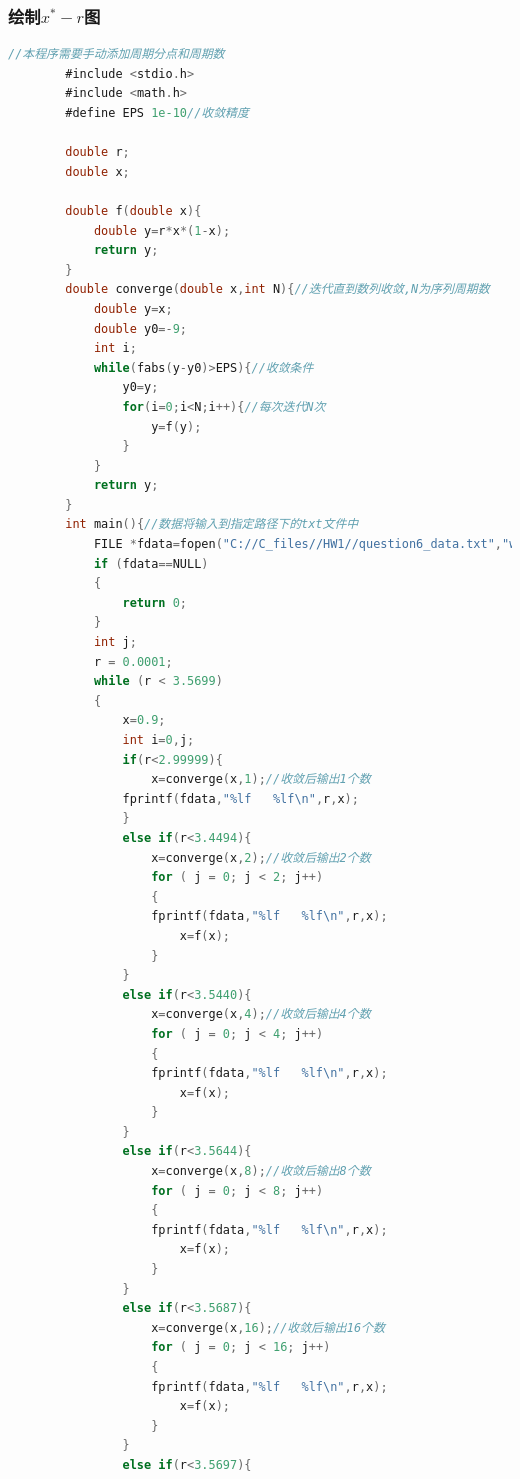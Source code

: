 \documentclass[10pt, a4paper]{article}
\begin{document}
    \subsubsection{绘制$x^*-r$图}
    \begin{lstlisting}[language=C]
        //本程序需要手动添加周期分点和周期数
        #include <stdio.h>
        #include <math.h>
        #define EPS 1e-10//收敛精度

        double r;
        double x;

        double f(double x){
            double y=r*x*(1-x);
            return y;
        }
        double converge(double x,int N){//迭代直到数列收敛,N为序列周期数
            double y=x;
            double y0=-9;
            int i;
            while(fabs(y-y0)>EPS){//收敛条件
                y0=y;
                for(i=0;i<N;i++){//每次迭代N次
                    y=f(y);
                }
            }
            return y;
        }
        int main(){//数据将输入到指定路径下的txt文件中
            FILE *fdata=fopen("C://C_files//HW1//question6_data.txt","w");
            if (fdata==NULL)
            {
                return 0;
            }
            int j;
            r = 0.0001;
            while (r < 3.5699)
            {
                x=0.9;
                int i=0,j;
                if(r<2.99999){
                    x=converge(x,1);//收敛后输出1个数
                fprintf(fdata,"%lf   %lf\n",r,x);
                }
                else if(r<3.4494){
                    x=converge(x,2);//收敛后输出2个数
                    for ( j = 0; j < 2; j++)
                    {
                    fprintf(fdata,"%lf   %lf\n",r,x);
                        x=f(x);
                    }
                }
                else if(r<3.5440){
                    x=converge(x,4);//收敛后输出4个数
                    for ( j = 0; j < 4; j++)
                    {
                    fprintf(fdata,"%lf   %lf\n",r,x);
                        x=f(x);
                    }
                }
                else if(r<3.5644){
                    x=converge(x,8);//收敛后输出8个数
                    for ( j = 0; j < 8; j++)
                    {
                    fprintf(fdata,"%lf   %lf\n",r,x);
                        x=f(x);
                    }
                }
                else if(r<3.5687){
                    x=converge(x,16);//收敛后输出16个数
                    for ( j = 0; j < 16; j++)
                    {
                    fprintf(fdata,"%lf   %lf\n",r,x);
                        x=f(x);
                    }
                }
                else if(r<3.5697){

\end{lstlisting}
\end{document}
